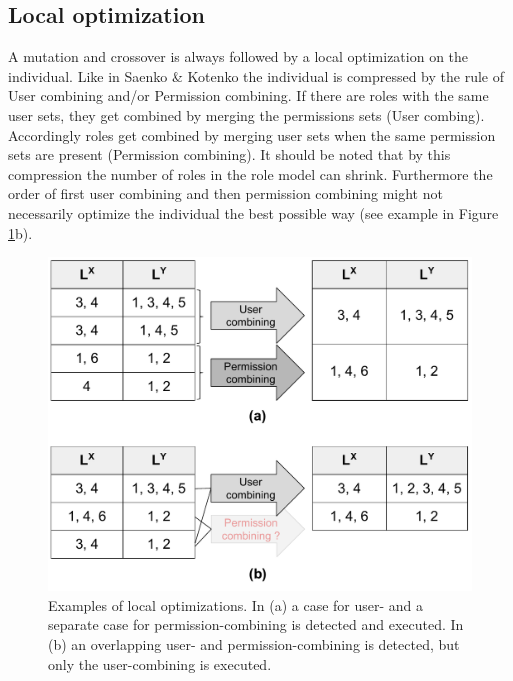         \subsection{Local optimization}
        \label{sec:localOptimization}
        A mutation and crossover is always followed by a local optimization on the individual. Like in Saenko \& Kotenko\cite{saenko2012design} the individual is compressed by the rule of User combining and/or Permission combining. If there are roles with the same user sets, they get combined by merging the permissions sets (User combing). Accordingly roles get combined by merging user sets when the same permission sets are present (Permission combining). It should be noted that by this compression the number of roles in the role model can shrink. Furthermore the order of first user combining and then permission combining might not necessarily optimize the individual the best possible way (see example in Figure \ref{fig:localOptimization}b).
        \begin{figure}[H]
            \centering
            \includegraphics[scale=0.3]{./Figures/LocalOptimization}
            \caption{Examples of local optimizations. In (a) a case for user- and a separate case for permission-combining is detected and executed. In (b) an overlapping user- and permission-combining is detected, but only the user-combining is executed.}
            \label{fig:localOptimization}
        \end{figure}
        
